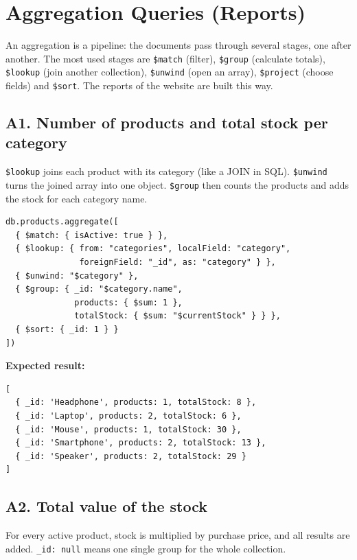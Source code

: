 \documentclass[11pt,a4paper]{article}
\newcommand{\code}[1]{\texttt{#1}}
\begin{document}
\section{Aggregation Queries (Reports)}
An aggregation is a pipeline: the documents pass through several stages, one after another. The most used stages are \code{\$match} (filter), \code{\$group} (calculate totals), \code{\$lookup} (join another collection), \code{\$unwind} (open an array), \code{\$project} (choose fields) and \code{\$sort}. The reports of the website are built this way.

\subsection*{A1. Number of products and total stock per category}
\code{\$lookup} joins each product with its category (like a JOIN in SQL). \code{\$unwind} turns the joined array into one object. \code{\$group} then counts the products and adds the stock for each category name.

\begin{minipage}{\linewidth}
\begin{lstlisting}[style=query]
db.products.aggregate([
  { $match: { isActive: true } },
  { $lookup: { from: "categories", localField: "category",
               foreignField: "_id", as: "category" } },
  { $unwind: "$category" },
  { $group: { _id: "$category.name",
              products: { $sum: 1 },
              totalStock: { $sum: "$currentStock" } } },
  { $sort: { _id: 1 } }
])
\end{lstlisting}
\end{minipage}

\noindent\textbf{Expected result:}
\begin{lstlisting}[style=result]
[
  { _id: 'Headphone', products: 1, totalStock: 8 },
  { _id: 'Laptop', products: 2, totalStock: 6 },
  { _id: 'Mouse', products: 1, totalStock: 30 },
  { _id: 'Smartphone', products: 2, totalStock: 13 },
  { _id: 'Speaker', products: 2, totalStock: 29 }
]
\end{lstlisting}

\subsection*{A2. Total value of the stock}
For every active product, stock is multiplied by purchase price, and all results are added. \code{\_id: null} means one single group for the whole collection.
\end{document}
